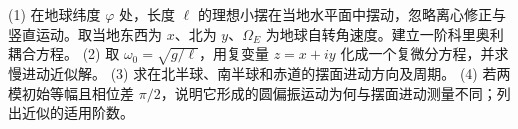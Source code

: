 (1) 在地球纬度 \(\varphi\) 处，长度 \(\ell\) 的理想小摆在当地水平面中摆动，忽略离心修正与竖直运动。取当地东西为 \(x\)、北为 \(y\)、\(\Omega_E\) 为地球自转角速度。建立一阶科里奥利耦合方程。
(2) 取 \(\omega_0=\sqrt{g/\ell}\)，用复变量 \(z=x+iy\) 化成一个复微分方程，并求慢进动近似解。
(3) 求在北半球、南半球和赤道的摆面进动方向及周期。
(4) 若两模初始等幅且相位差 \(\pi/2\)，说明它形成的圆偏振运动为何与摆面进动测量不同；列出近似的适用阶数。
